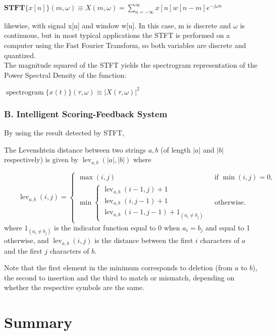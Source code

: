 ${\displaystyle \mathbf {STFT} \{x[n]\}(m,\omega )\equiv X(m,\omega )=\sum _{n=-\infty }^{\infty }x[n]w[n-m]e^{-j\omega n}}$

likewise, with signal x[n] and window w[n]. In this case, m is discrete and $\omega$ 
is continuous, but in most typical applications the STFT is performed on a computer 
using the Fast Fourier Transform, so both variables are discrete and quantized.\\
The magnitude squared of the STFT yields the spectrogram representation of the Power 
Spectral Density of the function:

${\displaystyle \operatorname {spectrogram} \{x(t)\}(\tau ,\omega )\equiv |X(\tau ,\omega )|^{2}}$

\subsubsection{B. Intelligent Scoring-Feedback System}
By using the result detected by STFT, 


The Levenshtein distance between two strings ${\displaystyle a,b}$ (of length ${\displaystyle |a|}$ 
and ${\displaystyle |b|}$ respectively) is given by ${\displaystyle \operatorname {lev} _{a,b}(|a|,|b|)}$ where

${\displaystyle \qquad \operatorname {lev} _{a,b}(i,j)={\begin{cases}\max(i,j)&{\text{ if }}\min(i,j)=0,\\\min {\begin{cases}\operatorname {lev} _{a,b}(i-1,j)+1\\\operatorname {lev} _{a,b}(i,j-1)+1\\\operatorname {lev} _{a,b}(i-1,j-1)+1_{(a_{i}\neq b_{j})}\end{cases}}&{\text{ otherwise.}}\end{cases}}}$\\


where ${\displaystyle 1_{(a_{i}\neq b_{j})}}$ is the indicator function equal to 0 when 
${\displaystyle a_{i}=b_{j}}$ and equal to 1 otherwise, and ${\displaystyle \operatorname {lev} _{a,b}(i,j)}$ 
is the distance between the first ${\displaystyle i}$ characters of ${\displaystyle a}$ and the
 first ${\displaystyle j}$ characters of ${\displaystyle b}$.

Note that the first element in the minimum corresponds to deletion (from ${\displaystyle a}$ to ${\displaystyle b}$), 
the second to insertion and the third to match or mismatch, depending on whether the respective symbols are the same.

\section{Summary}


